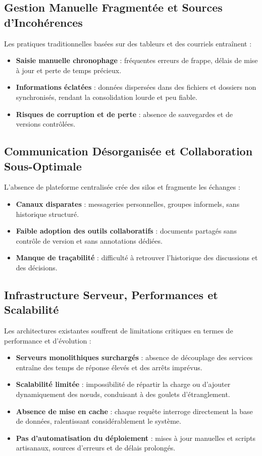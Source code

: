 \documentclass[12pt]{rapportPfe}
\begin{document}
\subsection*{Gestion Manuelle Fragmentée et Sources d’Incohérences}
Les pratiques traditionnelles basées sur des tableurs et des courriels entraînent :
\begin{itemize}[itemsep=1em]
  \item \textbf{Saisie manuelle chronophage} : fréquentes erreurs de frappe, délais de mise à jour et perte de temps précieux.
  \item \textbf{Informations éclatées} : données dispersées dans des fichiers et dossiers non synchronisés, rendant la consolidation lourde et peu fiable.
  \item \textbf{Risques de corruption et de perte} : absence de sauvegardes et de versions contrôlées.
\end{itemize}

\subsection*{Communication Désorganisée et Collaboration Sous-Optimale}
L’absence de plateforme centralisée crée des silos et fragmente les échanges :
\begin{itemize}[itemsep=1em]
  \item \textbf{Canaux disparates} : messageries personnelles, groupes informels, sans historique structuré.
  \item \textbf{Faible adoption des outils collaboratifs} : documents partagés sans contrôle de version et sans annotations dédiées.
  \item \textbf{Manque de traçabilité} : difficulté à retrouver l’historique des discussions et des décisions.
\end{itemize}

\subsection*{Infrastructure Serveur, Performances et Scalabilité}
Les architectures existantes souffrent de limitations critiques en termes de performance et d’évolution :
\begin{itemize}[itemsep=1em]
  \item \textbf{Serveurs monolithiques surchargés} : absence de découplage des services entraîne des temps de réponse élevés et des arrêts imprévus.
  \item \textbf{Scalabilité limitée} : impossibilité de répartir la charge ou d’ajouter dynamiquement des nœuds, conduisant à des goulets d’étranglement.
  \item \textbf{Absence de mise en cache} : chaque requête interroge directement la base de données, ralentissant considérablement le système.
  \item \textbf{Pas d’automatisation du déploiement} : mises à jour manuelles et scripts artisanaux, sources d’erreurs et de délais prolongés.
\end{itemize}
\end{document}
